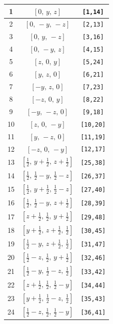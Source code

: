 \documentclass[fleqn,8pt]{jsarticle}
\begin{document}
\begin{longtable}{ccc}
1 & $\left[ 0,\, y,\, z \right]$ & {\tt [1,14]} \\ \hline
2 & $\left[ 0,\, - y,\, - z \right]$ & {\tt [2,13]} \\ \hline
3 & $\left[ 0,\, y,\, - z \right]$ & {\tt [3,16]} \\ \hline
4 & $\left[ 0,\, - y,\, z \right]$ & {\tt [4,15]} \\ \hline
5 & $\left[ z,\, 0,\, y \right]$ & {\tt [5,24]} \\ \hline
6 & $\left[ y,\, z,\, 0 \right]$ & {\tt [6,21]} \\ \hline
7 & $\left[ - y,\, z,\, 0 \right]$ & {\tt [7,23]} \\ \hline
8 & $\left[ - z,\, 0,\, y \right]$ & {\tt [8,22]} \\ \hline
9 & $\left[ - y,\, - z,\, 0 \right]$ & {\tt [9,18]} \\ \hline
10 & $\left[ z,\, 0,\, - y \right]$ & {\tt [10,20]} \\ \hline
11 & $\left[ y,\, - z,\, 0 \right]$ & {\tt [11,19]} \\ \hline
12 & $\left[ - z,\, 0,\, - y \right]$ & {\tt [12,17]} \\ \hline
13 & $\left[ \frac{1}{2},\, y + \frac{1}{2},\, z + \frac{1}{2} \right]$ & {\tt [25,38]} \\ \hline
14 & $\left[ \frac{1}{2},\, \frac{1}{2} - y,\, \frac{1}{2} - z \right]$ & {\tt [26,37]} \\ \hline
15 & $\left[ \frac{1}{2},\, y + \frac{1}{2},\, \frac{1}{2} - z \right]$ & {\tt [27,40]} \\ \hline
16 & $\left[ \frac{1}{2},\, \frac{1}{2} - y,\, z + \frac{1}{2} \right]$ & {\tt [28,39]} \\ \hline
17 & $\left[ z + \frac{1}{2},\, \frac{1}{2},\, y + \frac{1}{2} \right]$ & {\tt [29,48]} \\ \hline
18 & $\left[ y + \frac{1}{2},\, z + \frac{1}{2},\, \frac{1}{2} \right]$ & {\tt [30,45]} \\ \hline
19 & $\left[ \frac{1}{2} - y,\, z + \frac{1}{2},\, \frac{1}{2} \right]$ & {\tt [31,47]} \\ \hline
20 & $\left[ \frac{1}{2} - z,\, \frac{1}{2},\, y + \frac{1}{2} \right]$ & {\tt [32,46]} \\ \hline
21 & $\left[ \frac{1}{2} - y,\, \frac{1}{2} - z,\, \frac{1}{2} \right]$ & {\tt [33,42]} \\ \hline
22 & $\left[ z + \frac{1}{2},\, \frac{1}{2},\, \frac{1}{2} - y \right]$ & {\tt [34,44]} \\ \hline
23 & $\left[ y + \frac{1}{2},\, \frac{1}{2} - z,\, \frac{1}{2} \right]$ & {\tt [35,43]} \\ \hline
24 & $\left[ \frac{1}{2} - z,\, \frac{1}{2},\, \frac{1}{2} - y \right]$ & {\tt [36,41]} \\
\end{longtable}
\end{document}
